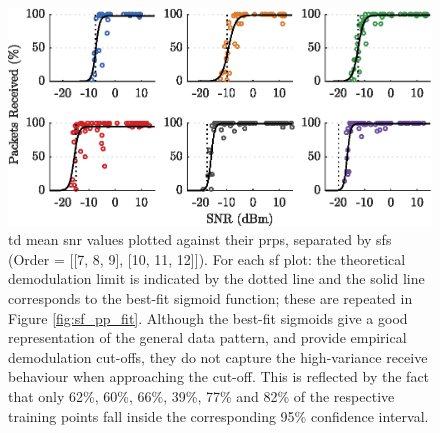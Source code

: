 \begin{figure}[H]
    \centering
   	\includegraphics{Figures/sf_pp_separate_plot}
    \caption[Plots of \ac{snr} vs \ac{prp}]{
   \ac{td} mean \ac{snr} values plotted against their \ac{prp}s, separated by \ac{sf}s (Order = [[7, 8, 9], [10, 11, 12]]). For each \ac{sf} plot: the theoretical demodulation limit is indicated by the dotted line and the solid line corresponds to the best-fit sigmoid function; these are repeated in Figure \ref{fig:sf_pp_fit}. Although the best-fit sigmoids give a good representation of the general data pattern, and provide empirical demodulation cut-offs, they do not capture the high-variance receive behaviour when approaching the cut-off. This is reflected by the fact that only 62\%, 60\%, 66\%, 39\%, 77\% and 82\% of the respective training points fall inside the corresponding 95\% confidence interval.
    }
    \label{fig:sf_pp_separate}
\end{figure}
\vspace{-0.5cm}


